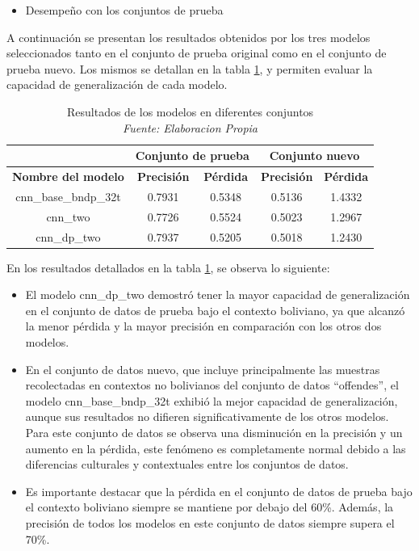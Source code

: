 \begin{itemize}
\item Desempeño con los conjuntos de prueba
\end{itemize}

A continuación se presentan los resultados obtenidos por los tres modelos seleccionados tanto en el conjunto de prueba original como en el conjunto de prueba nuevo. Los mismos se detallan en la tabla \ref{tbl:resultados}, y permiten evaluar la capacidad de generalización de cada modelo.


\begin{table}[!ht]
	\centering
	\begin{tabular}{|c|c|c|c|c|}
		\hline
		~ & \multicolumn{2}{|c|}{\textbf{Conjunto de prueba}} & \multicolumn{2}{|c|}{\textbf{Conjunto nuevo}} \\ \hline
		\textbf{Nombre del modelo} & \textbf{Precisión} & \textbf{Pérdida} & \textbf{Precisión} & \textbf{Pérdida} \\ \hline
		cnn\_base\_bndp\_32t & 0.7931 & 0.5348 & 0.5136 & 1.4332 \\ \hline
		cnn\_two & 0.7726 & 0.5524 & 0.5023 & 1.2967 \\ \hline
		cnn\_dp\_two & 0.7937 & 0.5205 & 0.5018 & 1.2430 \\ \hline
	\end{tabular}
	\caption[Resultados de los modelos en diferentes conjuntos]{Resultados de los modelos en diferentes conjuntos
		\\\textit{Fuente: Elaboracion Propia}}
	\label{tbl:resultados}
\end{table}


En los resultados detallados en la tabla \ref{tbl:resultados}, se observa lo siguiente:

\begin{itemize}

\item El modelo cnn\_dp\_two demostró tener la mayor capacidad de generalización en el conjunto de datos de prueba bajo el contexto boliviano, ya que alcanzó la menor pérdida y la mayor precisión en comparación con los otros dos modelos.

\item En el conjunto de datos nuevo, que incluye principalmente las muestras recolectadas en contextos no bolivianos del conjunto de datos “offendes”, el modelo cnn\_base\_bndp\_32t exhibió la mejor capacidad de generalización, aunque sus resultados no difieren significativamente de los otros modelos. Para este conjunto de datos se observa una disminución en la precisión y un aumento en la pérdida, este fenómeno es completamente normal debido a las diferencias culturales y contextuales entre los conjuntos de datos.


\item Es importante destacar que la pérdida en el conjunto de datos de prueba bajo el contexto boliviano siempre se mantiene por debajo del 60\%. Además, la precisión de todos los modelos en este conjunto de datos siempre supera el 70\%.

\end{itemize}

